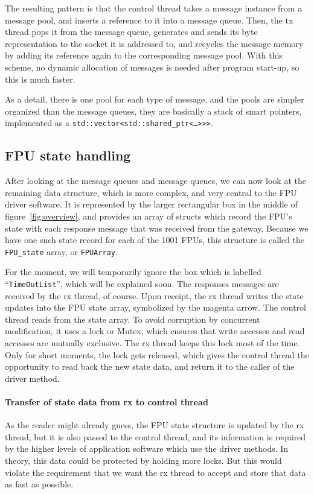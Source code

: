 \documentclass[fontsize=12,a4paper]{scrartcl}
\begin{document}
The resulting pattern is that the control thread takes a message
instance from a message pool, and inserts a reference to it into a
message queue. Then, the tx thread pops it from the message queue,
generates and sends its byte representation to the socket it is
addressed to, and recycles the message memory by adding its reference
again to the corresponding message pool. With this scheme, no dynamic
allocation of messages is needed after program start-up, so this is
much faster.

As a detail, there is one pool for each type of message, and the pools
are simpler organized than the message queues, they are basically a
stack of smart pointers, implemented as a \texttt{std::vector<std::shared\_ptr<\ldots>>>}.

\subsection{FPU state handling}

After looking at the message queues and message queues, we can now
look at the remaining data structure, which is more complex, and very
central to the FPU driver software. It is represented by the larger
rectangular box in the middle of figure~\ref{fig:overview}, and
provides an array of structs which record the FPU's state with each
response message that was received from the gateway. Because we have
one such state record for each of the 1001 FPUs, this structure is
called the \texttt{FPU\_state} array, or \texttt{FPUArray}.

For the moment, we will temporarily ignore the box which is labelled
``\texttt{TimeOutList}'', which will be explained soon.  The responses
messages are received by the rx thread, of course.  Upon receipt, the
rx thread writes the state updates into the FPU state array,
symbolized by the magenta arrow. The control thread reads from the
state array. To avoid corruption by concurrent modification, it uses a
lock or Mutex, which ensures that write accesses and read accesses are
mutually exclusive. The rx thread keeps this lock most of the
time. Only for short moments, the lock gets released, which gives the
control thread the opportunity to read back the new state data, and
return it to the caller of the driver method.

\paragraph{Transfer of state data from rx to control thread}
As the reader might already guess, the FPU state structure is updated
by the rx thread, but it is also passed to the control thread, and its
information is required by the higher levels of application software
which use the driver methods. In theory, this data could be protected
by holding more locks. But this would violate the requirement that we
want the rx thread to accept and store that data as fast as possible.
\end{document}
